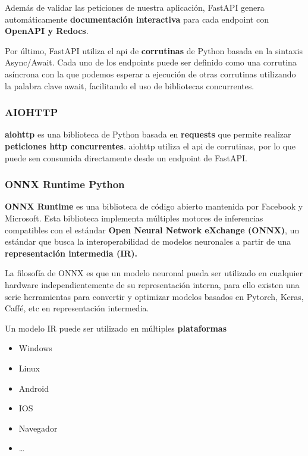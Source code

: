 Además de validar las peticiones de nuestra aplicación, FastAPI genera
automáticamente \textbf{documentación interactiva} para cada endpoint
con \textbf{OpenAPI y Redocs}.

Por último, FastAPI utiliza el api de \textbf{corrutinas} de Python
basada en la sintaxis Async/Await. Cada uno de los endpoints puede ser
definido como una corrutina asíncrona con la que podemos esperar a
ejecución de otras corrutinas utilizando la palabra clave await,
facilitando el uso de bibliotecas concurrentes.

\hypertarget{aiohttp}{%
\subsubsection{AIOHTTP}\label{aiohttp}}

\textbf{aiohttp} es una biblioteca de Python basada en \textbf{requests}
que permite realizar \textbf{peticiones http concurrentes}. aiohttp
utiliza el api de corrutinas, por lo que puede sen consumida
directamente desde un endpoint de FastAPI.

\hypertarget{section-1}{%
\subsubsection{}\label{section-1}}

\hypertarget{onnx-runtime-python}{%
\subsubsection{ONNX Runtime Python}\label{onnx-runtime-python}}

\textbf{ONNX Runtime} \cite{onnxruntime} es una biblioteca de código abierto mantenida por
Facebook y Microsoft. Esta biblioteca implementa múltiples motores de
inferencias compatibles con el estándar \textbf{Open Neural Network
eXchange (ONNX)}, un estándar que busca la interoperabilidad de modelos
neuronales a partir de una \textbf{representación intermedia (IR).}

La filosofía de ONNX es que un modelo neuronal pueda ser utilizado en
cualquier hardware independientemente de su representación interna, para
ello existen una serie herramientas para convertir y optimizar modelos
basados en Pytorch, Keras, Caffé, etc en representación intermedia.

Un modelo IR puede ser utilizado en múltiples \textbf{plataformas}

\begin{itemize}
\itemsep0em 
\item
  Windows
\item
  Linux
\item
  Android
\item
  IOS
\item
  Navegador
\item
  \ldots{}
\end{itemize}

